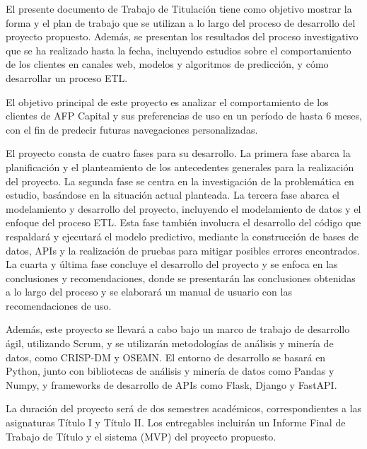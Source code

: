 El presente documento de Trabajo de Titulación tiene como objetivo mostrar la forma y el plan de trabajo que se utilizan a lo largo del proceso de desarrollo del proyecto propuesto. Además, se presentan los resultados del proceso investigativo que se ha realizado hasta la fecha, incluyendo estudios sobre el comportamiento de los clientes en canales web, modelos y algoritmos de predicción, y cómo desarrollar un proceso ETL.

El objetivo principal de este proyecto es analizar el comportamiento de los clientes de AFP Capital y sus preferencias de uso en un período de hasta 6 meses, con el fin de predecir futuras navegaciones personalizadas.

El proyecto consta de cuatro fases para su desarrollo. La primera fase abarca la planificación y el planteamiento de los antecedentes generales para la realización del proyecto. La segunda fase se centra en la investigación de la problemática en estudio, basándose en la situación actual planteada. La tercera fase abarca el modelamiento y desarrollo del proyecto, incluyendo el modelamiento de datos y el enfoque del proceso ETL. Esta fase también involucra el desarrollo del código que respaldará y ejecutará el modelo predictivo, mediante la construcción de bases de datos, APIs y la realización de pruebas para mitigar posibles errores encontrados. La cuarta y última fase concluye el desarrollo del proyecto y se enfoca en las conclusiones y recomendaciones, donde se presentarán las conclusiones obtenidas a lo largo del proceso y se elaborará un manual de usuario con las recomendaciones de uso.

Además, este proyecto se llevará a cabo bajo un marco de trabajo de desarrollo ágil, utilizando Scrum, y se utilizarán metodologías de análisis y minería de datos, como CRISP-DM y OSEMN. El entorno de desarrollo se basará en Python, junto con bibliotecas de análisis y minería de datos como Pandas y Numpy, y frameworks de desarrollo de APIs como Flask, Django y FastAPI.

La duración del proyecto será de dos semestres académicos, correspondientes a las asignaturas Título I y Título II. Los entregables incluirán un Informe Final de Trabajo de Título y el sistema (MVP) del proyecto propuesto.